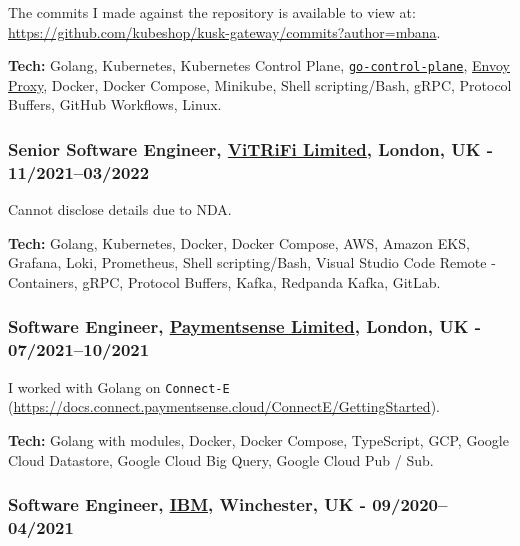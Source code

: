 \documentclass[
  a4paper,
]{article}
\begin{document}
The commits I made against the repository is available to view at:
\url{https://github.com/kubeshop/kusk-gateway/commits?author=mbana}.

\textbf{Tech:} Golang, Kubernetes, Kubernetes Control Plane,
\href{https://github.com/envoyproxy/go-control-plane}{\texttt{go-control-plane}},
\href{https://www.envoyproxy.io/}{Envoy Proxy}, Docker, Docker Compose,
Minikube, Shell scripting/Bash, gRPC, Protocol Buffers, GitHub
Workflows, Linux.

\hypertarget{senior-software-engineer-vitrifi-limited-london-uk---112021032022}{%
\subsubsection{\texorpdfstring{Senior Software Engineer,
\href{https://vitrifi.net}{ViTRiFi Limited}, London, UK -
11/2021--03/2022}{Senior Software Engineer, ViTRiFi Limited, London, UK - 11/2021--03/2022}}\label{senior-software-engineer-vitrifi-limited-london-uk---112021032022}}

Cannot disclose details due to NDA.

\textbf{Tech:} Golang, Kubernetes, Docker, Docker Compose, AWS, Amazon
EKS, Grafana, Loki, Prometheus, Shell scripting/Bash, Visual Studio Code
Remote - Containers, gRPC, Protocol Buffers, Kafka, Redpanda Kafka,
GitLab.

\hypertarget{software-engineer-paymentsense-limited-london-uk---072021102021}{%
\subsubsection{\texorpdfstring{Software Engineer,
\href{https://www.paymentsense.com}{Paymentsense Limited}, London, UK -
07/2021--10/2021}{Software Engineer, Paymentsense Limited, London, UK - 07/2021--10/2021}}\label{software-engineer-paymentsense-limited-london-uk---072021102021}}

I worked with Golang on \texttt{Connect-E}
(\url{https://docs.connect.paymentsense.cloud/ConnectE/GettingStarted}).

\textbf{Tech:} Golang with modules, Docker, Docker Compose, TypeScript,
GCP, Google Cloud Datastore, Google Cloud Big Query, Google Cloud Pub /
Sub.

\hypertarget{software-engineer-ibm-winchester-uk---092020042021}{%
\subsubsection{\texorpdfstring{Software Engineer,
\href{https://www.ibm.com/uk/en/}{IBM}, Winchester, UK -
09/2020--04/2021}{Software Engineer, IBM, Winchester, UK - 09/2020--04/2021}}\label{software-engineer-ibm-winchester-uk---092020042021}}
\end{document}
